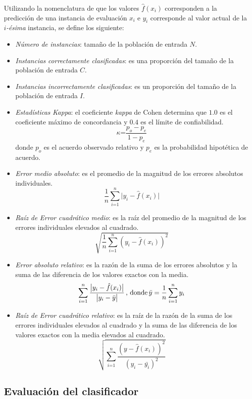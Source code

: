 Utilizando la nomenclatura de que los valores $\hat{f}(x_{i})$ corresponden
a la predicción de una instancia de evaluación $x_{i}$ e $y_{i}$
corresponde al valor actual de la \emph{$i$-ésima} instancia, se
define los siguiente:
\begin{itemize}
\item \emph{Número de instancias}: tamaño de la población de entrada $N$.
\item \emph{Instancias correctamente clasificadas}: es una proporción del
tamaño de la población de entrada $C$.
\item \emph{Instancias incorrectamente clasificadas}: es un proporción del
tamaño de la población de entrada $I$.
\item \emph{Estadísticas Kappa}: el coeficiente \emph{kappa} de Cohen determina
que $1.0$ es el coeficiente máximo de concordancia y $0.4$ es el
límite de confiabilidad. \\
\[
\kappa\text{=}\frac{p_{o}-p_{e}}{1-p_{e}}
\]
donde $p_{o}$ es el acuerdo observado relativo y $p_{e}$ es la probabilidad
hipotética de acuerdo.
\item \emph{Error medio absoluto}: es el promedio de la magnitud de los
errores absolutos individuales.
\[
\frac{1}{n}\sum_{i\text{=1}}^{n}\bigl|y_{i}-\hat{f}(x_{i})\bigr|
\]
\item \emph{Raíz de Error cuadrático medio}: es la raíz del promedio de
la magnitud de los errores individuales elevados al cuadrado.
\[
\sqrt{\frac{1}{n}\sum_{i\text{=1}}^{n}\left(y_{i}-\hat{f}(x_{i})\right)^{2}}
\]
\item \emph{Error absoluto relativo}: es la razón de la suma de los errores
absolutos y la suma de las diferencia de los valores exactos con la
media. 
\[
\sum_{i\text{=1}}^{n}\frac{\bigl|y_{i}-\hat{f}(x_{i})\bigr|}{\bigl|y_{i}-\bar{y}\bigr|}\,\textrm{, donde\,}\bar{y}=\frac{1}{n}\sum_{i=1}^{n}y_{i}
\]
\item \emph{Raíz de Error cuadrático relativo}: es la raíz de la razón de
la suma de los errores individuales elevados al cuadrado y la suma
de las diferencia de los valores exactos con la media elevados al
cuadrado. 
\[
\sqrt{\sum_{i\text{=1}}^{n}\frac{\left(y-\hat{f}(x_{i})\right)^{2}}{\left(y_{i}-\bar{y_{i}}\right)^{2}}}
\]
\end{itemize}

\subsection{Evaluación del clasificador}

